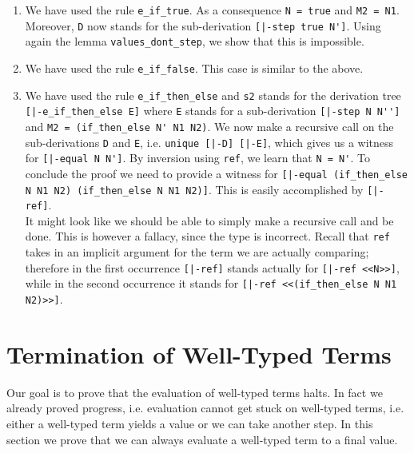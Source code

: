 \begin{enumerate}
\item We have used the rule \lstinline!e_if_true!. As a consequence
  \lstinline!N = true! and \lstinline!M2 = N1!. Moreover,
  \lstinline!D! now stands for the sub-derivation \lstinline![|-step true N']!.
  Using again the lemma \lstinline!values_dont_step!, we show that this is impossible.

\item We have used the rule \lstinline!e_if_false!. This case is
  similar to the above.

\item We have used the rule \lstinline!e_if_then_else! and
  \lstinline!s2! stands for the derivation tree
\mbox{\lstinline![|-e_if_then_else E]!} where \lstinline!E! stands for a sub-derivation
\lstinline![|-step N N'']! and \lstinline!M2 = (if_then_else N' N1 N2)!.
We now make a recursive call on the sub-derivations \lstinline!D! and
\lstinline!E!, i.e. \lstinline!unique [|-D] [|-E]!, which gives us a
witness for
\mbox{\lstinline![|-equal N N']!}. By inversion using \lstinline!ref!, we learn that
\lstinline!N = N'!. To conclude the proof we need to provide a witness for
\lstinline![|-equal (if_then_else N N1 N2) (if_then_else N N1 N2)]!. This is easily
accomplished by \lstinline![|-ref]!. \\[0.5em]
It might look like we should be able to simply make a recursive call
and be done. This is
however a fallacy, since the type is incorrect. Recall that \lstinline!ref!
takes in an implicit argument for the term we are actually comparing; therefore
in the first occurrence \lstinline![|-ref]! stands actually for
\lstinline![|-ref <<N>>]!, while in the second occurrence it
stands for \lstinline![|-ref <<(if_then_else N N1 N2)>>]!.
\end{enumerate}



\section{Termination of Well-Typed Terms}\label{sec:termination}

Our goal is to prove that the evaluation of well-typed terms halts. In
fact we already proved progress, i.e. evaluation cannot get stuck on
well-typed terms, i.e. either a well-typed term yields a value or we
can take another step. In this section we prove that we can always
evaluate a well-typed term to a final value.

